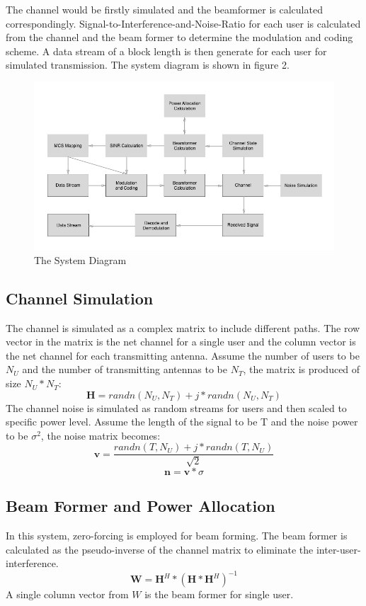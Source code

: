 \documentclass{article}
\begin{document}
The channel would be firstly simulated and the beamformer is calculated correspondingly. 
Signal-to-Interference-and-Noise-Ratio for each user is calculated from the channel and the beam former to determine the modulation and coding scheme.
A data stream of a block length is then generate for each user for simulated transmission.
The system diagram is shown in figure 2.
\begin{figure}[ht]
\centering
\includegraphics[scale=0.35]{SystemDia.png}
\caption{The System Diagram}
\label{fig:SystemDia}
\end{figure}
\subsection{Channel Simulation}
The channel is simulated as a complex matrix to include different paths. The row vector in the matrix is the net channel for a single user and the column vector is the net channel for each transmitting antenna. Assume the number of users to be $N_U$ and the number of transmitting antennas to be $N_T$, the matrix is produced of size $N_U * N_T$:
$$ \textbf{H} = randn(N_U,N_T) + j*randn(N_U,N_T)$$
The channel noise is simulated as random streams for users and then scaled to specific power level. Assume the length of the signal to be T and the noise power to be $\sigma^2$, the noise matrix becomes:
$$
\textbf{v} = \frac{randn(T,N_U)+j*randn(T,N_U)}{\sqrt2}
$$
$$
\textbf{n} = \textbf{v}*\sigma
$$
\subsection{Beam Former and Power Allocation}
In this system, zero-forcing is employed for beam forming.
The beam former is calculated as the pseudo-inverse of the channel matrix to eliminate the inter-user-interference.
$$
\textbf{W} = \textbf{H}^H*(\textbf{H}*\textbf{H}^H)^{-1}
$$
A single column vector from $W$ is the beam former for single user.
\end{document}
